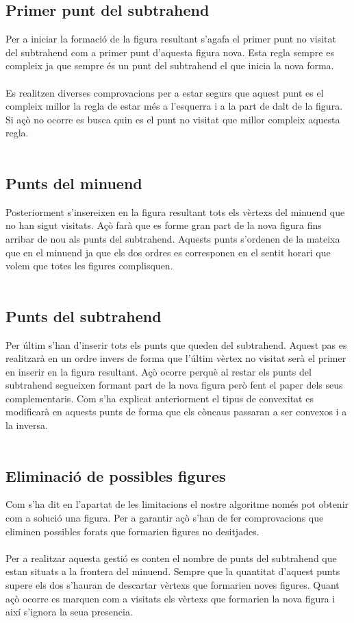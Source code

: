 \documentclass{article}
\begin{document}
\subsection{Primer punt del subtrahend}
Per a iniciar la formació de la figura resultant s'agafa el primer punt no visitat del subtrahend com a primer punt d'aquesta figura nova.
Esta regla sempre es compleix ja que sempre és un punt del subtrahend el que inicia la nova forma.
\\
\\
Es realitzen diverses comprovacions per a estar segurs que aquest punt es el compleix millor la regla de estar més a l'esquerra i a la part de dalt de la figura.
Si açò no ocorre es busca quin es el punt no visitat que millor compleix aquesta regla. 
\\
\\
\subsection{Punts del minuend}
Posteriorment s'insereixen en la figura resultant tots els vèrtexs del minuend que no han sigut visitats.
Açò farà que es forme gran part de la nova figura fins arribar de nou als punts del subtrahend.
Aquests punts s'ordenen de la mateixa que en el minuend ja que els dos ordres es corresponen en el sentit horari que volem que totes les figures complisquen.
\\
\\
\subsection{Punts del subtrahend}
Per últim s'han d'inserir tots els punts que queden del subtrahend.
Aquest pas es realitzarà en un ordre invers de forma que l'últim vèrtex no visitat serà el primer en inserir en la figura resultant.
Açò ocorre perquè al restar els punts del subtrahend segueixen formant part de la nova figura però fent el paper dels seus complementaris.
Com s'ha explicat anteriorment el tipus de convexitat es modificarà en aquests punts de forma que els còncaus passaran a ser convexos i a la inversa.
\\
\\
\subsection{Eliminació de possibles figures}
Com s'ha dit en l'apartat de les limitacions el nostre algoritme només pot obtenir com a solució una figura.
Per a garantir açò s'han de fer comprovacions que eliminen possibles forats que formarien figures no desitjades.
\\
\\
Per a realitzar aquesta gestió es conten el nombre de punts del subtrahend que estan situats a la frontera del minuend.
Sempre que la quantitat d'aquest punts supere els dos s'hauran de descartar vèrtexs que formarien noves figures.
Quant açò ocorre es marquen com a visitats els vèrtexs que formarien la nova figura i així s'ignora la seua presencia.
\\
\\
\end{document}

